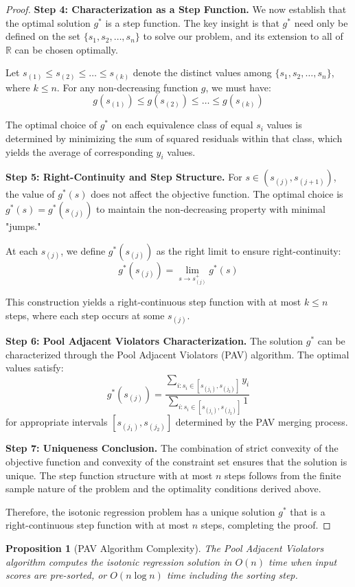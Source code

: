 \documentclass[12pt, a4paper]{article}
\newtheorem{proposition}{Proposition}
\begin{document}
\begin{proof}
\textbf{Step 4: Characterization as a Step Function.}
We now establish that the optimal solution $g^*$ is a step function. The key insight is that $g^*$ need only be defined on the set $\{s_1, s_2, \ldots, s_n\}$ to solve our problem, and its extension to all of $\mathbb{R}$ can be chosen optimally.

Let $s_{(1)} \leq s_{(2)} \leq \ldots \leq s_{(k)}$ denote the distinct values among $\{s_1, s_2, \ldots, s_n\}$, where $k \leq n$. For any non-decreasing function $g$, we must have:
$$g(s_{(1)}) \leq g(s_{(2)}) \leq \ldots \leq g(s_{(k)})$$

The optimal choice of $g^*$ on each equivalence class of equal $s_i$ values is determined by minimizing the sum of squared residuals within that class, which yields the average of corresponding $y_i$ values.

\textbf{Step 5: Right-Continuity and Step Structure.}
For $s \in (s_{(j)}, s_{(j+1)})$, the value of $g^*(s)$ does not affect the objective function. The optimal choice is $g^*(s) = g^*(s_{(j)})$ to maintain the non-decreasing property with minimal "jumps."

At each $s_{(j)}$, we define $g^*(s_{(j)})$ as the right limit to ensure right-continuity:
$$g^*(s_{(j)}) = \lim_{s \to s_{(j)}^+} g^*(s)$$

This construction yields a right-continuous step function with at most $k \leq n$ steps, where each step occurs at some $s_{(j)}$.

\textbf{Step 6: Pool Adjacent Violators Characterization.}
The solution $g^*$ can be characterized through the Pool Adjacent Violators (PAV) algorithm. The optimal values satisfy:
$$g^*(s_{(j)}) = \frac{\sum_{i: s_i \in [s_{(j_1)}, s_{(j_2)}]} y_i}{\sum_{i: s_i \in [s_{(j_1)}, s_{(j_2)}]} 1}$$
for appropriate intervals $[s_{(j_1)}, s_{(j_2)}]$ determined by the PAV merging process.

\textbf{Step 7: Uniqueness Conclusion.}
The combination of strict convexity of the objective function and convexity of the constraint set ensures that the solution is unique. The step function structure with at most $n$ steps follows from the finite sample nature of the problem and the optimality conditions derived above.

Therefore, the isotonic regression problem has a unique solution $g^*$ that is a right-continuous step function with at most $n$ steps, completing the proof.
\end{proof}

\begin{proposition}[PAV Algorithm Complexity]
The Pool Adjacent Violators algorithm computes the isotonic regression solution in $O(n)$ time when input scores are pre-sorted, or $O(n \log n)$ time including the sorting step.
\end{proposition}
\end{document}
